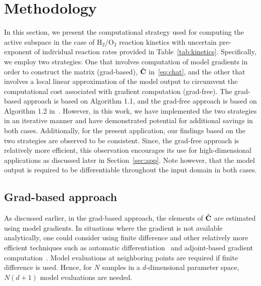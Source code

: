 \section{Methodology}
\label{sec:method}

In this section, we present the computational strategy used for computing the active subspace in the case of
H$_2$/O$_2$ reaction kinetics with uncertain pre-exponent of individual reaction rates provided in
Table~\ref{tab:kinetics}. Specifically, we employ two strategies: One that involves computation of model
gradients in order to construct the matrix (grad-based), $\hat{\mathbf{{C}}}$ in~\eqref{eq:chat}, and the other that involves a local 
linear approximation of the model output to circumvent the computational cost associated with gradient
computation (grad-free). The grad-based approach is based on Algorithm 1.1, and the grad-free approach is
based on Algorithm 1.2 in~\cite{Constantine:2015}. However, in this work, we have implemented the
two strategies in an iterative manner and have demonstrated potential for additional savings in both cases.
Additionally, for the present application, our findings based on the two strategies are observed to be consistent.
Since, the grad-free approach is relatively more efficient, this observation encourages its use for high-dimensional
applications as discussed later in Section~\ref{sec:app}. Note however, that the model output is required to be
differentiable throughout the input domain in both cases.

\subsection{Grad-based approach}
\label{sub:grad}

As discussed earlier, in the grad-based approach, the elements of $\hat{\mathbf{{C}}}$ are estimated using model gradients.
 In situations where the gradient is not available analytically, one could consider using
finite difference and other relatively more efficient techniques such as automatic differentiation~\cite{Kiparissides:2009} 
and adjoint-based gradient computation~\cite{Jameson:1988,Gunzburger:2003,Borzi:2011,Alexanderian:2017}.
Model evaluations at neighboring points are required if finite difference is used. Hence, for 
$N$ samples in a $d$-dimensional parameter space, $N(d+1)$ model evaluations are needed. 

